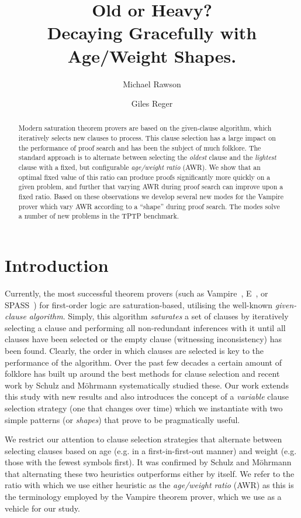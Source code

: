 \documentclass{llncs}
\title{Old or Heavy?\\Decaying Gracefully with Age/Weight Shapes.}
\author{Michael Rawson \and Giles Reger}
\institute{University of Manchester, Manchester, UK}
\newcommand{\sandm}{Schulz and M{\"{o}}hrmann}
\begin{document}
\maketitle
\begin{abstract}
Modern saturation theorem provers are based on the given-clause algorithm, which iteratively selects new clauses to process. This clause selection has a large impact on the performance of proof search and has been the subject of much folklore.  
The standard approach is to alternate between selecting the \emph{oldest} clause and the \emph{lightest} clause with a fixed, but configurable \emph{age/weight ratio} (AWR).
We show that an optimal fixed value of this ratio can produce proofs significantly more quickly on a given problem, and further that varying AWR during proof search can improve upon a fixed ratio.
Based on these observations we develop several new modes for the Vampire prover  which vary AWR according to a ``shape'' during proof search.
The modes solve a number of new problems in the TPTP benchmark.
\end{abstract}

\section{Introduction}
\label{sec:introduction}

Currently, the most successful theorem provers (such as Vampire~\cite{vampire}, E~\cite{E}, or SPASS~\cite{Spass}) for first-order logic are saturation-based, utilising the well-known \emph{given-clause algorithm}.
Simply, this algorithm \emph{saturates} a set of clauses by iteratively selecting a clause and performing all non-redundant inferences with it until all clauses have been selected or the empty clause (witnessing inconsistency) has been found.
Clearly, the order in which clauses are selected is key to the performance of the algorithm.
Over the past few decades a certain amount of folklore has built up around the best methods for clause selection and recent work by \sandm{} \cite{clause-selection-heuristics} systematically studied these.
Our work extends this study with new results and also introduces the concept of a \emph{variable} clause selection strategy (one that changes over time) which we instantiate with two simple patterns (or \emph{shapes}) that prove to be pragmatically useful.

We restrict our attention to clause selection strategies that alternate between selecting clauses based on age (e.g. in a first-in-first-out manner) and weight (e.g. those with the fewest symbols first).
It was confirmed by \sandm{} that alternating these two heuristics outperforms either by itself.
We refer to the ratio with which we use either heuristic as the \emph{age/weight ratio} (AWR) as this is the terminology employed by the Vampire theorem prover, which we use as a vehicle for our study.
\end{document}
